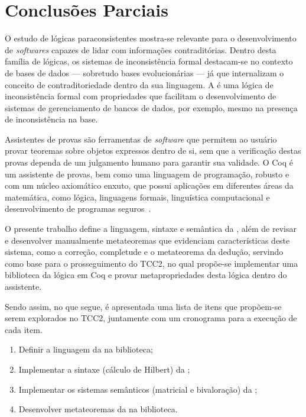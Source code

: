 \chapter{Conclusões Parciais}\label{chap:conclusao}

O estudo de lógicas paraconsistentes mostra-se relevante para o desenvolvimento de \textit{softwares} capazes de lidar com informações contraditórias. Dentro desta família de lógicas, os sistemas de inconsistência formal destacam-se no contexto de bases de dados {---} sobretudo bases evolucionárias {---} já que internalizam o conceito de contraditoriedade dentro da sua linguagem. A \lfium{} é uma lógica de inconsistência formal com propriedades que facilitam o desenvolvimento de sistemas de gerenciamento de bancos de dados, por exemplo, mesmo na presença de inconsistência na base.

Assistentes de provas são ferramentas de \textit{software} que permitem ao usuário provar teoremas sobre objetos expressos dentro de si, sem que a verificação destas provas dependa de um julgamento humano para garantir sua validade. O Coq é um assistente de provas, bem como uma linguagem de programação, robusto e com um núcleo axiomático enxuto, que possui aplicações em diferentes áreas da matemática, como lógica, linguagens formais, linguística computacional e desenvolvimento de programas seguros~\cite{coqart}.

O presente trabalho define a linguagem, sintaxe e semântica da \lfium{}, além de revisar e desenvolver manualmente metateoremas que evidenciam características deste sistema, como a correção, completude e o metateorema da dedução, servindo como base para o prosseguimento do TCC2, no qual propõe-se implementar uma biblioteca da lógica \lfium{} em Coq e provar metapropriedades desta lógica dentro do assistente.

Sendo assim, no que segue, é apresentada uma lista de itens que propõem-se serem explorados no TCC2, juntamente com um cronograma para a execução de cada item.

\begin{enumerate}
    \item Definir a linguagem da \lfium{} na biblioteca;
    \item Implementar a sintaxe (cálculo de Hilbert) da \lfium{};
    \item Implementar os sistemas semânticos (matricial e bivaloração) da \lfium{};
    \item Desenvolver metateoremas da \lfium{} na biblioteca.
\end{enumerate}

